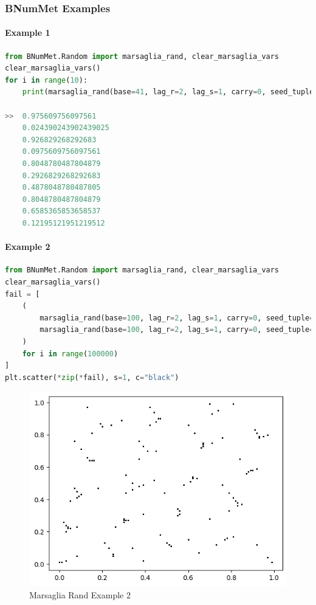 \subsubsection{BNumMet Examples}
\paragraph{Example 1}{
\begin{lstlisting}[language=Python]
from BNumMet.Random import marsaglia_rand, clear_marsaglia_vars
clear_marsaglia_vars()
for i in range(10):
    print(marsaglia_rand(base=41, lag_r=2, lag_s=1, carry=0, seed_tuple=(0, 1)))

>>  0.975609756097561
    0.024390243902439025
    0.926829268292683
    0.0975609756097561
    0.8048780487804879
    0.2926829268292683
    0.4878048780487805
    0.8048780487804879
    0.6585365853658537
    0.12195121951219512
\end{lstlisting}
}
\paragraph{Example 2}{
\begin{lstlisting}[language=Python]
from BNumMet.Random import marsaglia_rand, clear_marsaglia_vars
clear_marsaglia_vars()
fail = [
    (
        marsaglia_rand(base=100, lag_r=2, lag_s=1, carry=0, seed_tuple=(0, 1)),
        marsaglia_rand(base=100, lag_r=2, lag_s=1, carry=0, seed_tuple=(0, 1)),
    )
    for i in range(100000)
]
plt.scatter(*zip(*fail), s=1, c="black")
\end{lstlisting}
\begin{figure}[H]
    \centering
    \includegraphics{Include/Images/Thesis/Documentation/Randomness/Marsaglia Rand Example 2.png}
    \caption{Marsaglia Rand Example 2}
    \label{fig:Marsaglia Rand Example 2}
\end{figure}
}
